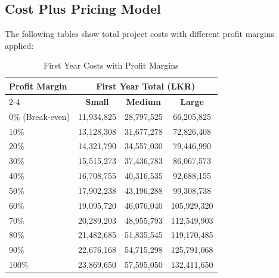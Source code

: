 \documentclass[12pt,a4paper]{article}
\begin{document}
\subsection{Cost Plus Pricing Model}

The following tables show total project costs with different profit margins applied:

\begin{table}[H]
\centering
\small
\begin{tabular}{|l|c|c|c|}
\hline
\multirow{2}{*}{\textbf{Profit Margin}} & \multicolumn{3}{c|}{\textbf{First Year Total (LKR)}} \\
\cline{2-4}
 & \textbf{Small} & \textbf{Medium} & \textbf{Large} \\
\hline
0\% (Break-even) & 11,934,825 & 28,797,525 & 66,205,825 \\
10\% & 13,128,308 & 31,677,278 & 72,826,408 \\
20\% & 14,321,790 & 34,557,030 & 79,446,990 \\
30\% & 15,515,273 & 37,436,783 & 86,067,573 \\
40\% & 16,708,755 & 40,316,535 & 92,688,155 \\
50\% & 17,902,238 & 43,196,288 & 99,308,738 \\
60\% & 19,095,720 & 46,076,040 & 105,929,320 \\
70\% & 20,289,203 & 48,955,793 & 112,549,903 \\
80\% & 21,482,685 & 51,835,545 & 119,170,485 \\
90\% & 22,676,168 & 54,715,298 & 125,791,068 \\
100\% & 23,869,650 & 57,595,050 & 132,411,650 \\
\hline
\end{tabular}
\caption{First Year Costs with Profit Margins}
\end{table}
\end{document}
